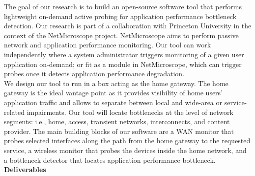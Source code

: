 \documentclass[11 pt]{article}
\begin{document}
The goal of our research is to build an open-source software tool that performs lightweight on-demand active probing for application performance bottleneck detection. Our research is part of a collaboration with Princeton University in the context of the NetMicroscope project. NetMicroscope aims to perform passive network and application performance monitoring. Our tool can work independently where a system administrator triggers monitoring of a given user application on-demand; or fit as a module in NetMicroscope, which can trigger probes once it detects application performance degradation.\\

We design our tool to run in a box acting as the home gateway. The home gateway is the ideal vantage point as it provides visibility of home users' application traffic and allows to separate between local and wide-area or service-related impairments. Our tool will locate bottlenecks at the level of network segments: i.e., home, access, transient networks, interconnects, and content provider. The main building blocks of our software are a WAN monitor that probes selected interfaces along the path from the home gateway to the requested service, a wireless monitor that probes the devices inside the home network, and a bottleneck detector that locates application performance bottleneck.\\

\textbf{Deliverables}
\end{document}
